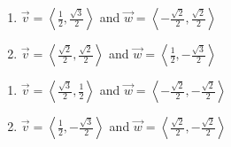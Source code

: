 \documentclass{ximera}
\begin{document}
\begin{multicols}{2} 

\begin{enumerate}

\setcounter{enumi}{\value{HW}}

\item $\vec{v} = \left\langle \frac{1}{2}, \frac{\sqrt{3}}{2} \right\rangle$ and $\vec{w} = \left\langle -\frac{\sqrt{2}}{2}, \frac{\sqrt{2}}{2} \right\rangle$
\item $\vec{v} = \left\langle \frac{\sqrt{2}}{2}, \frac{\sqrt{2}}{2} \right\rangle$ and $\vec{w} = \left\langle \frac{1}{2}, -\frac{\sqrt{3}}{2} \right\rangle$

\setcounter{HW}{\value{enumi}}

\end{enumerate}

\end{multicols}

\begin{multicols}{2} 

\begin{enumerate}

\setcounter{enumi}{\value{HW}}

\item $\vec{v} = \left\langle \frac{\sqrt{3}}{2}, \frac{1}{2} \right\rangle$ and $\vec{w} = \left\langle -\frac{\sqrt{2}}{2}, -\frac{\sqrt{2}}{2} \right\rangle$
\item $\vec{v} = \left\langle \frac{1}{2}, -\frac{\sqrt{3}}{2} \right\rangle$ and $\vec{w} = \left\langle \frac{\sqrt{2}}{2}, -\frac{\sqrt{2}}{2} \right\rangle$ \label{dotprodbasiclast}

\setcounter{HW}{\value{enumi}}

\end{enumerate}

\end{multicols}
\end{document}

